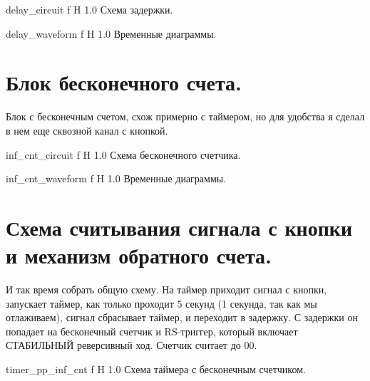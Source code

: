 \documentclass{bmstu}
\begin{document}
	{delay_circuit}
	{f} %
	{H} %
	{1.0\textwidth} %
	{Схема задержки.} %
	
	{delay_waveform}
	{f} %
	{H} %
	{1.0\textwidth} %
	{Временные диаграммы.} %

	\section{Блок бесконечного счета.}
	
	\begin{flushleft}
		Блок с бесконечным счетом, схож примерно с таймером, но для удобства я сделал в нем еще сквозной канал с кнопкой.
	\end{flushleft}
	
	{inf_cnt_circuit}
	{f} %
	{H} %
	{1.0\textwidth} %
	{Схема бесконечного счетчика.} %
	
	{inf_cnt_waveform}
	{f} %
	{H} %
	{1.0\textwidth} %
	{Временные диаграммы.} %

	\section{Схема считывания сигнала с кнопки и механизм обратного счета.}

	\begin{flushleft}
		И так время собрать общую схему. На таймер приходит сигнал с кнопки, 
		запускает таймер, как только проходит 5 секунд (1 секунда, так как мы отлаживаем), 
		сигнал сбрасывает таймер, и переходит в задержку. С задержки он
		попадает на бесконечный счетчик и RS-триггер, который включает
		СТАБИЛЬНЫЙ реверсивный ход. Счетчик считает до 00.
	\end{flushleft}

	{timer_pp_inf_cnt}
	{f} %
	{H} %
	{1.0\textwidth} %
	{Схема таймера с бесконечным счетчиком.} %

\end{document}
